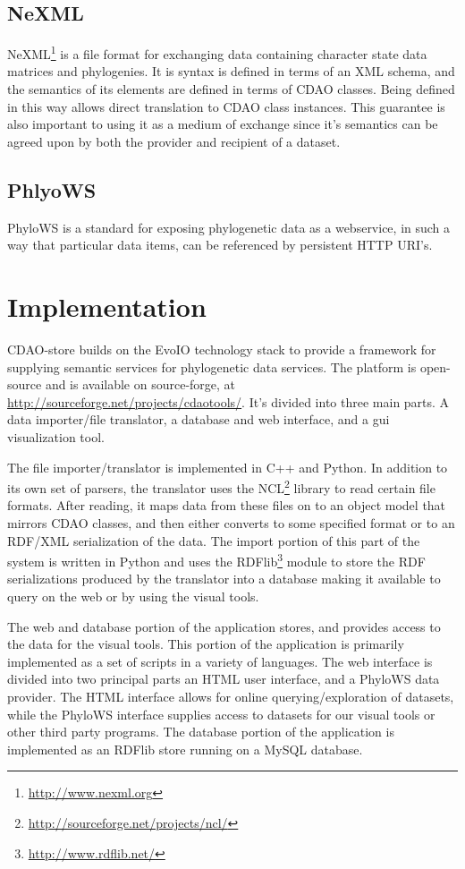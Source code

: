 \documentclass[10pt]{bmc_article}
\newenvironment{bmcformat}{\begin{raggedright}\baselineskip20pt\sloppy\setboolean{publ}{false}}{\end{raggedright}\baselineskip20pt\sloppy}
\begin{document}
\begin{bmcformat}
\subsection*{NeXML}
  NeXML\footnote{\url{http://www.nexml.org}} is a file format for exchanging data containing character state data
  matrices and phylogenies. It is syntax is defined in terms of an XML schema, and the semantics of its elements
  are defined in terms of CDAO classes. Being defined in this way allows direct translation to CDAO class instances.
  This guarantee is also important to using it as a medium of exchange since it's semantics can be agreed upon by
  both the provider and recipient of a dataset.

\subsection*{PhlyoWS}
  PhyloWS is a standard for exposing phylogenetic data as a webservice, in such a way that particular data items,
  can be referenced by persistent HTTP URI's.

\section*{Implementation}

CDAO-store builds on the EvoIO technology stack to provide a framework for supplying semantic services
for phylogenetic data services. The platform is open-source and is available on source-forge, at
\url{http://sourceforge.net/projects/cdaotools/}. It's divided into three main parts. A data importer/file translator,
a database and web interface, and a gui visualization tool. 

The file importer/translator is implemented in C++ and Python. In addition to its own set of parsers, 
the translator uses the NCL\footnote{\url{http://sourceforge.net/projects/ncl/}} library to read certain file formats.
After reading, it maps data from these files on to an object model that mirrors CDAO classes, and then either converts
to some specified format or to an RDF/XML serialization of the data. The import portion of this part of the system is
written in Python and uses the RDFlib\footnote{\url{http://www.rdflib.net/}} module to store the RDF serializations 
produced by the translator into a database making it available to query on the web or by using the visual tools.

The web and database portion of the application stores, and provides access to the data for the visual tools. This
portion of the application is primarily implemented as a set of scripts in a variety of languages. The web interface
is divided into two principal parts an HTML user interface, and a PhyloWS data provider. The HTML interface allows 
for online querying/exploration of datasets, while the PhyloWS interface supplies access to datasets for our visual
tools or other third party programs. The database portion of the application is implemented as an RDFlib store running
on a MySQL database. 


\end{bmcformat}
\end{document}
